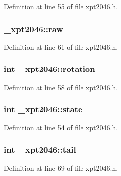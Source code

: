Definition at line 55 of file xpt2046.\+h.

\subsubsection[{\texorpdfstring{raw}{raw}}]{ \+\_\+xpt2046\+::raw}\hypertarget{struct__xpt2046_a167dbfd40e17aadb4c0edd901db7e118}{}\label{struct__xpt2046_a167dbfd40e17aadb4c0edd901db7e118}


Definition at line 61 of file xpt2046.\+h.

\subsubsection[{\texorpdfstring{rotation}{rotation}}]{\setlength{\rightskip}{0pt plus 5cm}int \+\_\+xpt2046\+::rotation}\hypertarget{struct__xpt2046_a9730fbc57085ba0f27bf5563fbbce98b}{}\label{struct__xpt2046_a9730fbc57085ba0f27bf5563fbbce98b}


Definition at line 58 of file xpt2046.\+h.

\subsubsection[{\texorpdfstring{state}{state}}]{\setlength{\rightskip}{0pt plus 5cm}int \+\_\+xpt2046\+::state}\hypertarget{struct__xpt2046_a271e59b1fe899e8d1199f617bd381b15}{}\label{struct__xpt2046_a271e59b1fe899e8d1199f617bd381b15}


Definition at line 54 of file xpt2046.\+h.

\subsubsection[{\texorpdfstring{tail}{tail}}]{\setlength{\rightskip}{0pt plus 5cm}int \+\_\+xpt2046\+::tail}\hypertarget{struct__xpt2046_a22287733194e6d32116347f39f77523f}{}\label{struct__xpt2046_a22287733194e6d32116347f39f77523f}


Definition at line 69 of file xpt2046.\+h.

